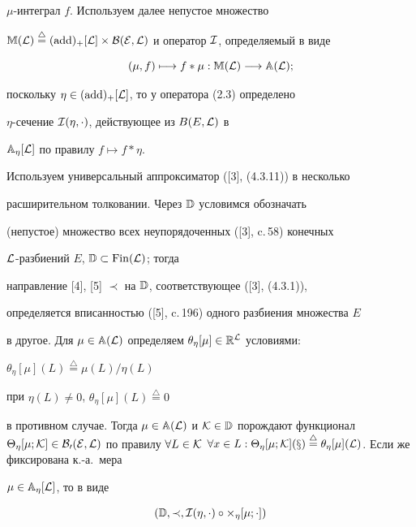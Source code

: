 $\mu$-интеграл $f$. Используем далее непустое множество


$\Bbb M(\cal L)\overset{\triangle}{=}{}(\add)_+[\cal L]\times


B(E,\cal L)$ и оператор $\cal I$, определяемый в виде


\begin{equation}


(\mu,f)\longmapsto f*\mu:\Bbb M(\cal L)\longrightarrow


\Bbb A(\cal L);


\end{equation}


поскольку $\eta\in(\operatorname{add})_+[\cal L]$, то у оператора (2.3) определено


$\eta$-сечение $\cal I(\eta,\cdot)$, действующее из $B(E,\cal L)$ в


$\Bbb A_\eta[\cal L]$ по правилу $f\longmapsto f*\eta$.


Используем универсальный аппроксиматор ([3], (4.3.11)) в несколько


расширительном толковании. Через $\Bbb D$ условимся обозначать


(непустое) множество всех неупорядоченных ([3], c.\,58) конечных


$\cal L$-разбиений $E$, $\Bbb D\subset\operatorname{Fin}(\cal L)$; тогда


направление [4], [5] $\prec$ на $\Bbb D$, соответствующее ([3], (4.3.1)),


определяется вписанностью ([5], c.\,196) одного разбиения множества $E$


в другое. Для $\mu\in\Bbb A(\cal L)$ определяем $\theta_\eta[\mu]


\in\Bbb R^{\cal L}$ условиями:


$\theta_\eta[\mu](L)\overset{\triangle}{=}{}\mu(L)/\eta(L)$


при $\eta(L)\ne0$, $\theta_\eta[\mu](L)\overset{\triangle}{=}{}0$


в противном случае. Тогда $\mu\in\Bbb A(\cal L)$ и $\cal K\in


\Bbb D$ порождают функционал $\Theta_\eta[\mu;\cal K]\in


B_0(E,\cal L)$ по правилу $\forall L\in\cal K$ $\forall x\in


L:\Theta_\eta[\mu;\cal K](x)\overset{\triangle}{=}{}


\theta_\eta[\mu](L)$. Если же фиксирована к.-а.~мера


$\mu\in\Bbb A_\eta[\cal L]$, то в виде


\begin{equation}


(\Bbb D,\prec,\cal I(\eta,\cdot)\circ\Theta_\eta[\mu;\cdot])


\end{equation}


